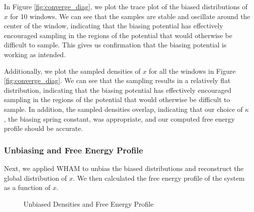 \documentclass{article}
\begin{document}

In Figure \ref{fig:converge_diag}, we plot the trace plot of the biased distributions of $x$ for 10 windows. We can see that the samples are stable and oscillate around the center of the window, indicating that the biasing potential has effectively encouraged sampling in the regions of the potential that would otherwise be difficult to sample. This gives us confirmation that the biasing potential is working as intended.

Additionally, we plot the sampled densities of $x$ for all the windows in Figure \ref{fig:converge_diag}. We can see that the sampling results in a relatively flat distribution, indicating that the biasing potential has effectively encouraged sampling in the regions of the potential that would otherwise be difficult to sample. In addition, the sampled densities overlap, indicating that our choice of $\kappa$, the biasing spring constant, was appropriate, and our computed free energy profile should be accurate.

\subsubsection{Unbiasing and Free Energy Profile}

Next, we applied WHAM to unbias the biased distributions and reconstruct the global distribution of $x$. We then calculated the free energy profile of the system as a function of $x$.

\begin{figure}%
    \centering
    \qquad
    \caption{Unbiased Densities and Free Energy Profile}%
    \label{fig:unbiased_densities}%
\end{figure}
\end{document}
